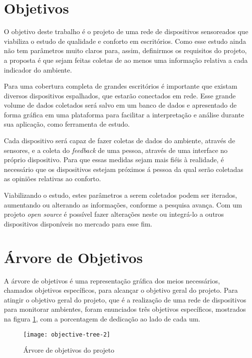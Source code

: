 \documentclass[../monografia.tex]{subfiles}
\begin{document}
\section{Objetivos}

O objetivo deste trabalho é o projeto de uma rede de dispositivos sensoreados que viabiliza o estudo de qualidade e conforto em escritórios. Como esse estudo ainda não tem parâmetros muito claros para, assim, definirmos os requisitos do projeto, a proposta é que sejam feitas coletas de ao menos uma informação relativa a cada indicador do ambiente. 

Para uma cobertura completa de grandes escritórios é importante que existam diversos dispositivos espalhados, que estarão conectados em rede. Esse grande volume de dados coletados será salvo em um banco de dados e apresentado de forma gráfica em uma plataforma para facilitar a interpretação e análise durante sua aplicação, como ferramenta de estudo. 

Cada dispositivo será capaz de fazer coletas de dados do ambiente, através de sensores, e a coleta do \textit{feedback} de uma pessoa, através de uma interface no próprio dispositivo. Para que essas medidas sejam mais fiéis à realidade, é necessário que os dispositivos estejam próximos á pessoa da qual serão coletadas as opiniões relativas ao conforto. 

Viabilizando o estudo, estes parâmetros a serem coletados podem ser iterados, aumentando ou alterando as informações, conforme a pesquisa avança. Com um projeto \textit{open source} é possível fazer alterações neste ou integrá-lo a outros dispositivos disponíveis no mercado para esse fim. 

\section{Árvore de Objetivos} 
A árvore de objetivos é uma representação gráfica dos meios necessários, chamados objetivos específicos, para alcançar o objetivo geral do projeto. Para atingir o objetivo geral do projeto, que é a realização de uma rede de dispositivos para monitorar ambientes, foram enunciados três objetivos específicos, mostrados na figura \ref{fig:objective-tree}, com a porcentagem de dedicação ao lado de cada um.

\begin{figure}[h!]
\texttt{[image: objective-tree-2]}
\centering
\caption{Árvore de objetivos do projeto}
\label{fig:objective-tree}
\end{figure}
\end{document}
